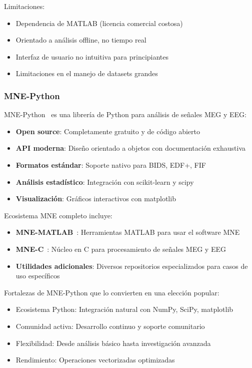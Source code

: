 Limitaciones:
\begin{itemize}
    \item Dependencia de MATLAB (licencia comercial costosa)
    \item Orientado a análisis offline, no tiempo real
    \item Interfaz de usuario no intuitiva para principiantes
    \item Limitaciones en el manejo de datasets grandes
\end{itemize}

\subsubsection{MNE-Python}
MNE-Python~\cite{mne_python} es una librería de Python para análisis de señales MEG y EEG:

\begin{itemize}
    \item \textbf{Open source}: Completamente gratuito y de código abierto
    \item \textbf{API moderna}: Diseño orientado a objetos con documentación exhaustiva
    \item \textbf{Formatos estándar}: Soporte nativo para BIDS, EDF+, FIF
    \item \textbf{Análisis estadístico}: Integración con scikit-learn y scipy
    \item \textbf{Visualización}: Gráficos interactivos con matplotlib
\end{itemize}

Ecosistema MNE completo incluye:
\begin{itemize}
    \item \textbf{MNE-MATLAB}~\cite{mne_matlab}: Herramientas MATLAB para usar el software MNE
    \item \textbf{MNE-C}~\cite{mne_c}: Núcleo en C para procesamiento de señales MEG y EEG
    \item \textbf{Utilidades adicionales}: Diversos repositorios especializados para casos de uso específicos
\end{itemize}

Fortalezas de MNE-Python que lo convierten en una elección popular:
\begin{itemize}
    \item Ecosistema Python: Integración natural con NumPy, SciPy, matplotlib
    \item Comunidad activa: Desarrollo continuo y soporte comunitario
    \item Flexibilidad: Desde análisis básico hasta investigación avanzada
    \item Rendimiento: Operaciones vectorizadas optimizadas
\end{itemize}

